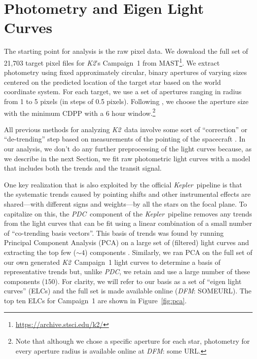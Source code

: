 \documentclass[12pt,preprint]{aastex}
\newcommand{\project}[1]{\textsl{#1}} %
\newcommand{\kepler}{\project{Kepler}}
\newcommand{\KT}{\project{K2}}
\newcommand{\pdc}{\project{PDC}}
\newcommand{\figref}[1]{\ref{fig:#1}}
\newcommand{\Fig}[1]{Figure~\figref{#1}}
\newcommand{\sectionname}{Section}
\newcommand{\sectlabel}[1]{\label{sect:#1}}
\newcommand{\todo}[3]{{\color{#2}\emph{#1}: #3}}
\newcommand{\dfmtodo}[1]{\todo{DFM}{red}{#1}}
\begin{document}
\section{Photometry and Eigen Light Curves}
\sectlabel{phot}

The starting point for analysis is the raw pixel data.
We download the full set of 21,703 target pixel files for \KT's Campaign~1
from MAST\footnote{\url{https://archive.stsci.edu/k2/}}.
We extract photometry using fixed approximately circular, binary apertures of
varying sizes centered on the predicted location of the target star based on
the world coordinate system.
For each target, we use a set of apertures ranging in radius from 1 to 5
pixels (in steps of 0.5 pixels).
Following \citet{Vanderburg:2014}, we choose the aperture size with the
minimum CDPP \citep{cdpp} with a 6 hour window.\footnote{Note that although we
chose a specific aperture for each star, photometry for every aperture radius
is available online at \dfmtodo{some URL}.}

All previous methods for analyzing \KT\ data involve some sort of
``correction'' or ``de-trending'' step based on measurements of the pointing
of the spacecraft \citep{Vanderburg:2014, Aigrain:2015, Crossfield:2015}.
In our analysis, we don't do any further preprocessing of the light curves
because, as we describe in the next \sectionname, we fit raw photometric light
curves with a model that includes both the trends and the transit signal.

One key realization that is also exploited by the official \kepler\ pipeline
is that the systematic trends caused by pointing shifts and other instrumental
effects are shared---with different signs and weights---by all the stars on
the focal plane.
To capitalize on this, the \pdc\ component of the \kepler\ pipeline
removes any trends from the light curves that can be fit using a linear
combination of a small number of ``co-trending basis vectors''.
This basis of trends was found by running Principal Component Analysis (PCA)
on a large set of (filtered) light curves and extracting the top few ($\sim 4$)
components \citep{pdc1, pdc2}.
Similarly, we ran PCA on the full set of our own generated \KT\ Campaign~1
light curves to determine a basis of representative trends but, unlike \pdc,
we retain and use a large number of these components ($150$).
For clarity, we will refer to our basis as a set of ``eigen light curves''
(ELCs) and the full set is made available online (\dfmtodo{SOMEURL}).
The top ten ELCs for Campaign~1 are shown in \Fig{pca}.
\end{document}
